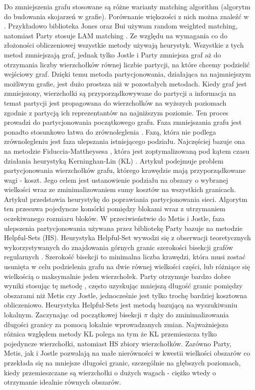 Do zmniejszenia grafu stosowane są różne warianty matching algorithm (algorytm do budowania skojarzeń w grafie).
Porównanie większości z nich można znaleźć w \cite{Analysis}.
Przykładowo biblioteka Jones oraz Bui \cite{Bui1993AHF} używam random weighted matching, natomiast Party \cite{1364754}
stosuje LAM matching \cite{weighted_maching}.
Ze względu na wymagania co do złożoności obliczeniowej wszystkie metody używają heurystyk.
Wszystkie z tych metod zmniejszają graf, jednak tylko Jostle i Party zmniejsza graf
aż do otrzymania liczby wierzchołków równej liczbie partycji, na które chcemy podzielić wejściowy graf.
Dzięki temu metoda partycjonowania, działająca na najmniejszym możliwym grafie, jest dużo prostsza niż w pozostałych metodach.
Kiedy graf jest zmniejszony, wierzchołki są przyporządkowywane do partycji a informacja na temat partycji jest propagowana
do wierzchołków na wyższych poziomach zgodnie z partycją ich reprezentantów na najniższym poziomie.
Ten proces prowadzi do partycjonowania początkowego grafu.
Faza zmniejszania grafu jest ponadto stosunkowo łatwa do zrównoleglenia \cite{KARYPIS199871}.
Fazą, która nie podlega zrównolegleniu jest faza ulepszania istniejącego podziału.
Najczęściej bazuje ona na metodzie Fiduccia-Mattheysesa \cite{10.5555/800263.809204},
która jest zoptymalizowaną pod kątem czasu działania heurystyką Kerninghan-Lin (KL) \cite{6771089}.
Artykuł \cite{6771089} podejmuje problem partycjonowania wierzchołków grafu, którego krawędzie mają
przyporządkowane wagi - koszt.
Jego celem jest ustanowienie podziału na obszary o wybranej wielkości wraz
ze zminimalizowaniem sumy kosztów na wszystkich granicach.
Artykuł \cite{10.5555/800263.809204} przedstawia heurystykę do poprawiania partycjonowania sieci.
Algorytm ten przesuwa pojedyncze komórki pomiędzy blokami wraz z utrzymaniem oczekiwanego rozmiaru bloków.
W przeciwieństwie do Metis i Jostle, faza ulepszenia partycjonowania używana przez bibliotekę Party bazuje na metodzie
Helpful-Sets (HS).
Heurystyka Helpful-Set wywodzi się z obserwacji teoretycznych wykorzystywanych do znajdowania górnych
granic szerokości bisekcji grafów regularnych \cite{10.1007/3-540-54345-7_64, MONIEN2006475}.
Szerokość bisekcji to minimalna liczba krawędzi, która musi zostać usunięta w celu podzielenia grafu na
dwie równej wielkości części, lub różniące się wielkością o maksymalnie jeden wierzchołek.
Party otrzymuje bardzo dobre wyniki stosując tę metodę \cite{10.1007/3-540-44842-X_6}, często uzyskując mniejszą długość
granic pomiędzy obszarami niż Metis czy Jostle, jednocześnie jest tylko trochę bardziej kosztowna obliczeniowo.
Heurystyka Helpful-Sets jest metodą bazującą na wyszukiwaniu lokalnym.
Zaczynając od początkowej bisekcji \(\pi\) dąży
do zminimalizowania długości granicy za pomocą lokalnie wprowadzanych zmian.
Najważniejsza różnica względem metody KL polega na tym że KL przemieszcza tylko pojedyncze wierzchołki,
natomiast HS zbiory wierzchołków.
Zarówno Party, Metis, jak i Jostle pozwalają na małe nierówności w kwestii wielkości obszarów co przekłada się na
mniejsze długości granic,
szczególnie na głębszych poziomach, kiedy przemieszczane są wierzchołki o dużych wagach - ciężko wtedy o otrzymanie
idealnie równych obszarów.

